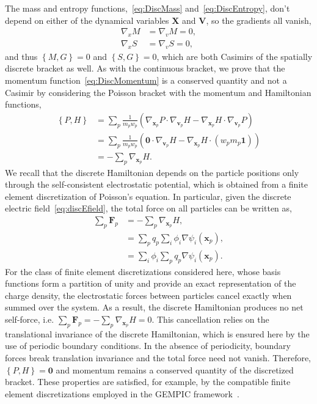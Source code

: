 \documentclass[preprint,12pt]{elsarticle}
\theoremstyle{definition}
\begin{document}
The mass and entropy functions,~\eqref{eq:DiscMass} and~\eqref{eq:DiscEntropy}, don't depend on either of the dynamical variables $\mathbf{X}$ and $\mathbf{V}$, so the gradients all vanish,
\begin{align*}
    \nabla_x M &= \nabla_v M = 0,\\
    \nabla_x S &= \nabla_v S = 0,
\end{align*}
and thus $\left\{ M,G \right\} = 0$ and $\left\{ S,G \right\} = 0$, which are both Casimirs of the spatially discrete bracket as well. As with the continuous bracket, we prove that the momentum function~\eqref{eq:DiscMomentum} is a conserved quantity and not a Casimir by considering the Poisson bracket with the momentum and Hamiltonian functions,
\begin{align*}
    \left\{P,H\right\} &= \sum_p \frac{1}{m_p w_p}\left(\nabla_{\boldsymbol{x}_p} P \cdot \nabla_{\boldsymbol{v}_p} H - \nabla_{\boldsymbol{x}_p} H \cdot \nabla_{\boldsymbol{v}_p} P \right) \\
    &= \sum_p \frac{1}{m_p w_p}\left( \mathbf{0} \cdot \nabla_{\boldsymbol{v}_p} H - \nabla_{\boldsymbol{x}_p} H \cdot (w_p m_p \mathbf{1}) \right) \\
    &= - \sum_p \nabla_{\boldsymbol{x}_p} H.
\end{align*}
We recall that the discrete Hamiltonian depends on the particle positions only through the self-consistent electrostatic potential, which is obtained from a finite element discretization of Poisson's equation. In particular, given the discrete electric field~\eqref{eq:discEfield}, the total force on all particles can be written as,
\begin{align*}
    \sum_p \boldsymbol{F}_p &= - \sum_p \nabla_{\boldsymbol{x}_p} H,\\
    &= \sum_p q_p \sum_{i} \phi_i \nabla \psi_i (\boldsymbol{x}_p), \\
    &= \sum_{i} \phi_i \sum_p q_p \nabla \psi_i (\boldsymbol{x}_p).
\end{align*}
For the class of finite element discretizations considered here, whose basis functions form a partition of unity and provide an exact representation of the charge density, the electrostatic forces between particles cancel exactly when summed over the system. As a result, the discrete Hamiltonian produces no net self-force, i.e. $\sum_p \boldsymbol{F}_p = - \sum_p \nabla_{\boldsymbol{x}_p} H = 0$. This cancellation relies on the translational invariance of the discrete Hamiltonian, which is ensured here by the use of periodic boundary conditions. In the absence of periodicity, boundary forces break translation invariance and the total force need not vanish. Therefore, $\left\{P,H\right\} = \mathbf{0}$ and momentum remains a conserved quantity of the discretized bracket. These properties are satisfied, for example, by the compatible finite element discretizations employed in the GEMPIC framework~\cite{Kraus2017_GEMPIC}.
\end{document}
